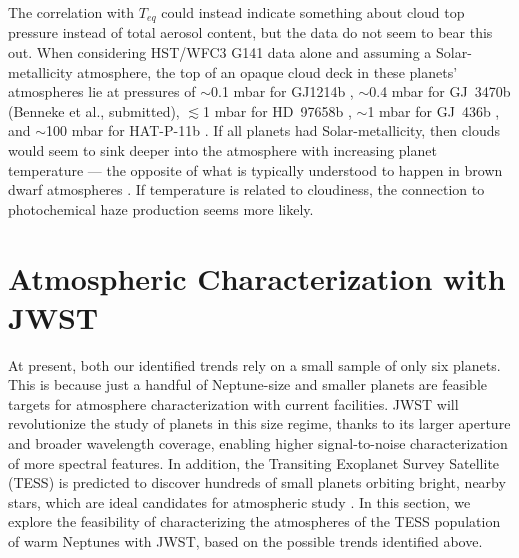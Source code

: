 \documentclass[twocolumn]{aastex61}
\begin{document}
The correlation with $T_{eq}$ could instead indicate something about
cloud top pressure instead of total aerosol content, but the data do
not seem to bear this out.  When considering HST/WFC3 G141 data alone
and assuming a Solar-metallicity atmosphere, the top of an opaque
cloud deck in these planets' atmospheres lie at pressures of $\sim$0.1
mbar for GJ1214b \citep{kreidberg:2014}, $\sim$0.4 mbar for GJ~3470b
(Benneke et al., submitted), $\lesssim$1 mbar for HD~97658b
\citep{knutson:2014a}, $\sim$1 mbar for GJ~436b \citep{knutson:2014b},
and $\sim$100 mbar for HAT-P-11b \citep{fraine:2014}.  If all planets
had Solar-metallicity, then clouds would seem to sink deeper into the
atmosphere with increasing planet temperature --- the opposite of what
is typically understood to happen in brown dwarf atmospheres
\citep[e.g.,][]{lodders:2004}. If temperature is related to
cloudiness, the connection to photochemical haze production seems more
likely.



%
%
\section{Atmospheric Characterization with JWST}
\label{sec:tess}
At present, both our identified trends rely on a small sample of only
six planets. This is because just a handful of Neptune-size and
smaller planets are feasible targets for atmosphere characterization
with current facilities.  JWST will revolutionize the study of planets
in this size regime, thanks to its larger aperture and broader
wavelength coverage, enabling higher signal-to-noise characterization
of more spectral features. In addition, the Transiting Exoplanet
Survey Satellite (TESS) is predicted to discover hundreds of small
planets orbiting bright, nearby stars, which are ideal candidates for
atmospheric study \citep{ricker:2014,sullivan:2015}. In this section,
we explore the feasibility of characterizing the atmospheres of the
TESS population of warm Neptunes with JWST, based on the possible
trends identified above.
\end{document}

